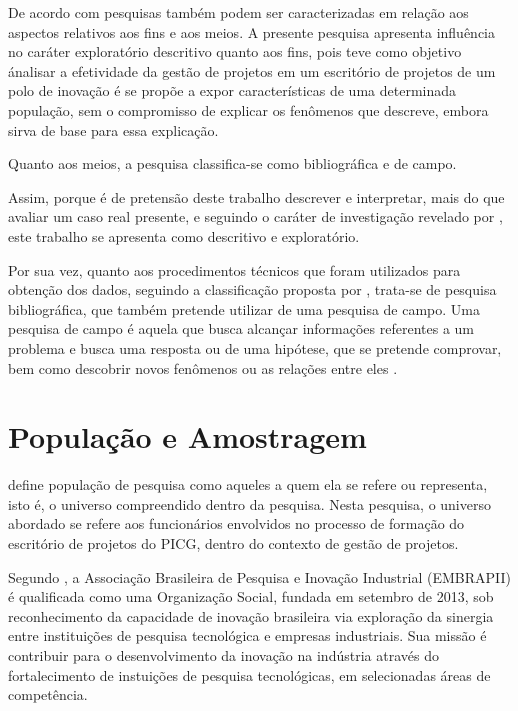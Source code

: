 De acordo com  pesquisas também podem ser caracterizadas em relação aos aspectos relativos aos fins e aos meios. A presente pesquisa apresenta influência no caráter exploratório descritivo quanto aos fins, pois teve como objetivo \'analisar a efetividade da gestão de projetos em um escritório de projetos de um polo de inovação \'e se propõe a expor características de uma determinada população, sem o compromisso de explicar os fenômenos que descreve, embora sirva de base para essa explicação.

Quanto aos meios, a pesquisa classifica-se como bibliográfica e de campo.

Assim, porque é de pretensão deste trabalho descrever e interpretar, mais do que avaliar um caso real presente, e seguindo o caráter de investigação revelado por , este trabalho se apresenta como descritivo e exploratório.

Por sua vez, quanto aos procedimentos técnicos que foram utilizados para obtenção dos dados, seguindo a classificação proposta por , trata-se de pesquisa bibliográfica, que também pretende utilizar de uma pesquisa de campo. Uma pesquisa de campo é aquela que busca alcançar informações referentes a um problema e busca uma resposta ou de uma hipótese, que se pretende comprovar, bem como descobrir novos fenômenos ou as relações entre eles \cite{de2007metodologia}.


\section{População e Amostragem}

   define população de pesquisa como aqueles a quem ela se refere ou representa, isto é, o universo compreendido dentro da pesquisa. Nesta pesquisa, o universo abordado se refere aos funcionários envolvidos no processo de formação do escritório de projetos do PICG, dentro do contexto de gestão de projetos.

  Segundo , a Associação Brasileira de Pesquisa e Inovação Industrial (EMBRAPII) é qualificada como uma Organização Social, fundada em setembro de 2013, sob reconhecimento da capacidade de inovação brasileira via exploração da sinergia entre instituições de pesquisa tecnológica e empresas industriais. Sua missão é contribuir para o desenvolvimento da inovação na indústria através do fortalecimento de instuições de pesquisa tecnológicas, em selecionadas áreas de competência.

